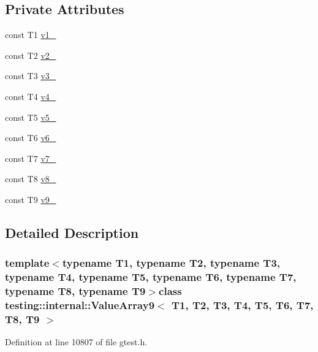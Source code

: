 \subsection*{\-Private \-Attributes}
\begin{DoxyCompactItemize}
\item 
const \-T1 \hyperlink{classtesting_1_1internal_1_1ValueArray9_aac1d0654cc6c1aceb4a5d0fa7a98042e}{v1\-\_\-}
\item 
const \-T2 \hyperlink{classtesting_1_1internal_1_1ValueArray9_a9f0a8ce6ce2fd27e980c4c51a7a7256a}{v2\-\_\-}
\item 
const \-T3 \hyperlink{classtesting_1_1internal_1_1ValueArray9_a4f8257321a2eab0456239174d6712d5e}{v3\-\_\-}
\item 
const \-T4 \hyperlink{classtesting_1_1internal_1_1ValueArray9_aac184059fee257381ccae81d8d112f85}{v4\-\_\-}
\item 
const \-T5 \hyperlink{classtesting_1_1internal_1_1ValueArray9_a1f3e0ada8419ed2e17cc61e6c0c54404}{v5\-\_\-}
\item 
const \-T6 \hyperlink{classtesting_1_1internal_1_1ValueArray9_a13d84d5824617bbc6fb1a6b3ee3cb745}{v6\-\_\-}
\item 
const \-T7 \hyperlink{classtesting_1_1internal_1_1ValueArray9_a4063f0b7a528133d018ee488ba44a9a3}{v7\-\_\-}
\item 
const \-T8 \hyperlink{classtesting_1_1internal_1_1ValueArray9_a596bc5260b2474271d1f6910ff6f665d}{v8\-\_\-}
\item 
const \-T9 \hyperlink{classtesting_1_1internal_1_1ValueArray9_a6356e16cf54a9dfac8525f20242af31e}{v9\-\_\-}
\end{DoxyCompactItemize}


\subsection{\-Detailed \-Description}
\subsubsection*{template$<$typename \-T1, typename \-T2, typename \-T3, typename \-T4, typename \-T5, typename \-T6, typename \-T7, typename \-T8, typename \-T9$>$class testing\-::internal\-::\-Value\-Array9$<$ T1, T2, T3, T4, T5, T6, T7, T8, T9 $>$}



\-Definition at line 10807 of file gtest.\-h.



